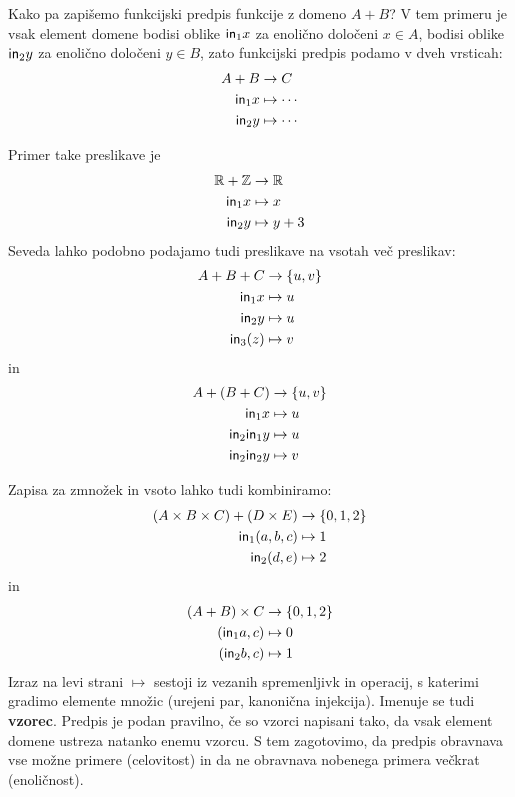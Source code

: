 Kako pa zapišemo funkcijski predpis funkcije z domeno $A + B$? V tem primeru je vsak element domene bodisi oblike
$\mathsf{in}_{1}{x}$ za enolično določeni $x \in A$, bodisi oblike $\mathsf{in}_{2}{y}$ za enolično določeni $y \in B$, zato funkcijski predpis podamo v dveh vrsticah:
%
\begin{align*}
    A + B &\to C \\
    \mathsf{in}_{1}{x} &\mapsto \cdots \\
    \mathsf{in}_{2}{y} &\mapsto \cdots
\end{align*}

\begin{primer}
  Primer take preslikave je
  \begin{align*}
    \mathbb{R} + \mathbb{Z} &\to \mathbb{R} \\
    \mathsf{in}_{1}{x} &\mapsto x \\
    \mathsf{in}_{2}{y} &\mapsto y + 3
  \end{align*}
  Seveda lahko podobno podajamo tudi preslikave na vsotah več preslikav:
  \begin{align*}
    A + B + C &\to \{u, v\} \\
    \mathsf{in}_{1}{x} &\mapsto u \\
    \mathsf{in}_{2}{y} &\mapsto u \\
    \mathsf{in}_3(z) &\mapsto v
  \end{align*}
  in
  \begin{align*}
    A + (B + C) &\to \{u, v\} \\
    \mathsf{in}_{1}{x} &\mapsto u \\
    \mathsf{in}_{2}{\mathsf{in}_{1}{y}} &\mapsto u \\
    \mathsf{in}_{2}{\mathsf{in}_{2}{y}} &\mapsto v
  \end{align*}
\end{primer}

Zapisa za zmnožek in vsoto lahko tudi kombiniramo:
%
\begin{align*}
  (A \times B \times C) + (D \times E) &\to \{0, 1, 2\} \\
  \mathsf{in}_{1}{(a, b, c)} &\mapsto 1 \\
  \mathsf{in}_{2}{(d, e)} &\mapsto 2
\end{align*}
%
in
\begin{align*}
  (A + B) \times C &\to \{0, 1, 2\} \\
  (\mathsf{in}_{1}{a}, c) &\mapsto 0 \\
  (\mathsf{in}_{2}{b}, c) &\mapsto 1
\end{align*}
%
Izraz na levi strani $\mapsto$ sestoji iz vezanih spremenljivk in operacij, s katerimi gradimo elemente množic (urejeni par, kanonična injekcija). Imenuje se tudi \textbf{vzorec}. Predpis je podan pravilno, če so vzorci napisani tako, da vsak element domene ustreza natanko enemu vzorcu.
%
S tem zagotovimo, da predpis obravnava vse možne primere (celovitost) in da ne obravnava nobenega primera večkrat (enoličnost).


